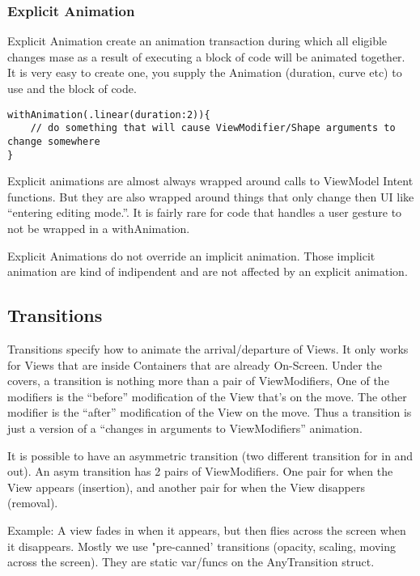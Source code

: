 \documentclass[]{article}
\begin{document}
\hypertarget{explicit-animation}{%
\subsubsection{Explicit Animation}\label{explicit-animation}}

Explicit Animation create an animation transaction during which all
eligible changes mase as a result of executing a block of code will be
animated together. It is very easy to create one, you supply the
Animation (duration, curve etc) to use and the block of code.

\begin{verbatim}
withAnimation(.linear(duration:2)){
    // do something that will cause ViewModifier/Shape arguments to change somewhere
}
\end{verbatim}

Explicit animations are almost always wrapped around calls to ViewModel
Intent functions. But they are also wrapped around things that only
change then UI like ``entering editing mode.''. It is fairly rare for
code that handles a user gesture to not be wrapped in a withAnimation.

Explicit Animations do not override an implicit animation. Those
implicit animation are kind of indipendent and are not affected by an
explicit animation.

\hypertarget{transitions}{%
\subsection{Transitions}\label{transitions}}

Transitions specify how to animate the arrival/departure of Views. It
only works for Views that are inside Containers that are already
On-Screen. Under the covers, a transition is nothing more than a pair of
ViewModifiers, One of the modifiers is the ``before'' modification of
the View that's on the move. The other modifier is the ``after''
modification of the View on the move. Thus a transition is just a
version of a ``changes in arguments to ViewModifiers'' animation.

It is possible to have an asymmetric transition (two different
transition for in and out). An asym transition has 2 pairs of
ViewModifiers. One pair for when the View appears (insertion), and
another pair for when the View disappers (removal).

Example: A view fades in when it appears, but then flies across the
screen when it disappears. Mostly we use "pre-canned' transitions
(opacity, scaling, moving across the screen). They are static var/funcs
on the AnyTransition struct.
\end{document}
